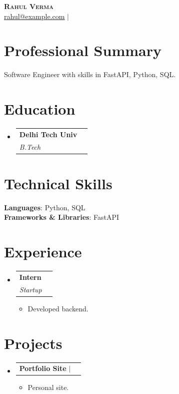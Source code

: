 \documentclass[letterpaper,10pt]{article}
\makeatletter
\newcommand{\resumeItem}[1]{
  \item\small{
    {#1 \vspace{-2pt}}
  }
}
\newcommand{\resumeSubheading}[4]{
  \vspace{-2pt}\item
    \begin{tabular*}{0.97\textwidth}[t]{l@{\extracolsep{\fill}}r}
      \textbf{#1} & #2 \\
      \textit{\small#3} & \textit{\small #4} \\
    \end{tabular*}\vspace{-7pt}
}
\newcommand{\resumeProjectHeading}[2]{
    \item
    \begin{tabular*}{0.97\textwidth}{l@{\extracolsep{\fill}}r}
      \small#1 & #2 \\
    \end{tabular*}\vspace{-7pt}
}
\newcommand{\resumeSubHeadingListStart}{\begin{itemize}[leftmargin=0.15in, label={}]}
\newcommand{\resumeSubHeadingListEnd}{\end{itemize}}
\newcommand{\resumeItemListStart}{\begin{itemize}}
\newcommand{\resumeItemListEnd}{\end{itemize}\vspace{-5pt}}
\makeatother
\begin{document}
\begin{center}
    \textbf{\Huge \scshape Rahul Verma} \\ \vspace{2pt}
    \small 
        \href{mailto:rahul@example.com}{\underline{rahul@example.com}} $|$             \end{center}

\section{Professional Summary}
\small{Software Engineer with skills in FastAPI, Python, SQL.}
\vspace{2pt}

\section{Education}
  \resumeSubHeadingListStart
          \resumeSubheading
        {Delhi Tech Univ}{}
        {B.Tech}{}
      \resumeSubHeadingListEnd

\section{Technical Skills}
 \begin{itemize}[leftmargin=0.15in, label={}]
    \small{\item{
                        \textbf{Languages}: Python, SQL \\
                                \textbf{Frameworks & Libraries}: FastAPI \\
                                                            }}
 \end{itemize}

\section{Experience}
  \resumeSubHeadingListStart
          \resumeSubheading
        {Intern}{}
        {Startup}{}
        \resumeItemListStart
                      \resumeItem{Developed backend.}
                  \resumeItemListEnd
      \resumeSubHeadingListEnd

\section{Projects}
    \resumeSubHeadingListStart
              \resumeProjectHeading
          {\textbf{Portfolio Site} $|$ \emph{}}{}
          \resumeItemListStart
                          \resumeItem{Personal site.}
                      \resumeItemListEnd
          \resumeSubHeadingListEnd

\end{document}
